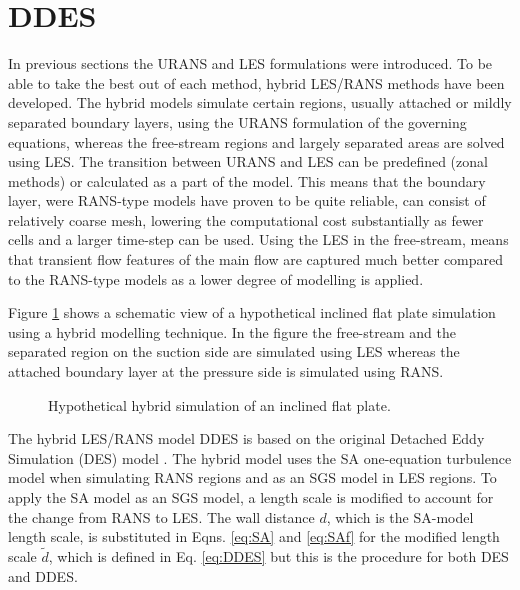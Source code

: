 \section{DDES}
In previous sections the URANS and LES formulations were introduced. To be able to take the best out of each method, hybrid LES/RANS methods have been developed. The hybrid models simulate certain regions, usually attached or mildly separated boundary layers, using the URANS formulation of the governing equations, whereas the free-stream regions and largely separated areas are solved using LES. The transition between URANS and LES can be predefined (zonal methods) or calculated as a part of the model. This means that the boundary layer, were RANS-type models have proven to be quite reliable, can consist of relatively coarse mesh, lowering the computational cost substantially as fewer cells and a larger time-step can be used. Using the LES in the free-stream, means that transient flow features of the main flow are captured much better compared to the RANS-type models as a lower degree of modelling is applied.

Figure \ref{fig:FPDDES} shows a schematic view of a hypothetical inclined flat plate simulation using a hybrid modelling technique. In the figure the free-stream and the separated region on the suction side are simulated using LES whereas the attached boundary layer at the pressure side is simulated using RANS.
\begin{figure}[H]
  \centering

  \caption{Hypothetical hybrid simulation of an inclined flat plate.}\label{fig:FPDDES}
\end{figure}

The hybrid LES/RANS model DDES is based on the original Detached Eddy Simulation (DES) model \cite{DES97}. The hybrid model uses the SA one-equation turbulence model when simulating RANS regions and as an SGS model in LES regions. To apply the SA model as an SGS model, a length scale is modified to account for the change from RANS to LES. The wall distance $d$, which is the SA-model length scale, is substituted in Eqns. \ref{eq:SA} and \ref{eq:SAf} for the modified length scale $\tilde{d}$, which is defined in Eq. \ref{eq:DDES} but this is the procedure for both DES and DDES. 

